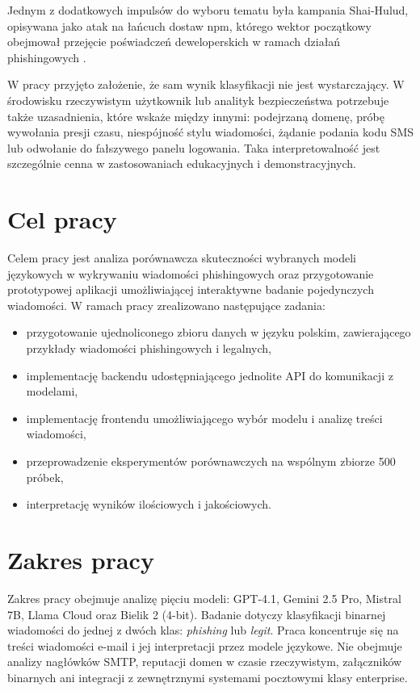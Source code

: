 \documentclass[12pt,a4paper,openright]{report}
\begin{document}
Jednym z dodatkowych impulsów do wyboru tematu była kampania Shai-Hulud, opisywana jako atak na łańcuch dostaw npm, którego wektor początkowy obejmował przejęcie poświadczeń deweloperskich w ramach działań phishingowych \cite{sekurak2025shaihulud,blackduck2025shaihulud}.

W pracy przyjęto założenie, że sam wynik klasyfikacji nie jest wystarczający. W środowisku rzeczywistym użytkownik lub analityk bezpieczeństwa potrzebuje także uzasadnienia, które wskaże między innymi: podejrzaną domenę, próbę wywołania presji czasu, niespójność stylu wiadomości, żądanie podania kodu SMS lub odwołanie do fałszywego panelu logowania. Taka interpretowalność jest szczególnie cenna w zastosowaniach edukacyjnych i demonstracyjnych.

\section{Cel pracy}

Celem pracy jest analiza porównawcza skuteczności wybranych modeli językowych w wykrywaniu wiadomości phishingowych oraz przygotowanie prototypowej aplikacji umożliwiającej interaktywne badanie pojedynczych wiadomości. W ramach pracy zrealizowano następujące zadania:

\begin{itemize}
    \item przygotowanie ujednoliconego zbioru danych w języku polskim, zawierającego przykłady wiadomości phishingowych i legalnych,
    \item implementację backendu udostępniającego jednolite API do komunikacji z modelami,
    \item implementację frontendu umożliwiającego wybór modelu i analizę treści wiadomości,
    \item przeprowadzenie eksperymentów porównawczych na wspólnym zbiorze 500 próbek,
    \item interpretację wyników ilościowych i jakościowych.
\end{itemize}

\section{Zakres pracy}

Zakres pracy obejmuje analizę pięciu modeli: GPT-4.1, Gemini 2.5 Pro, Mistral 7B, Llama Cloud oraz Bielik 2 (4-bit). Badanie dotyczy klasyfikacji binarnej wiadomości do jednej z dwóch klas: \textit{phishing} lub \textit{legit}. Praca koncentruje się na treści wiadomości e-mail i jej interpretacji przez modele językowe. Nie obejmuje analizy nagłówków SMTP, reputacji domen w czasie rzeczywistym, załączników binarnych ani integracji z zewnętrznymi systemami pocztowymi klasy enterprise.
\end{document}
